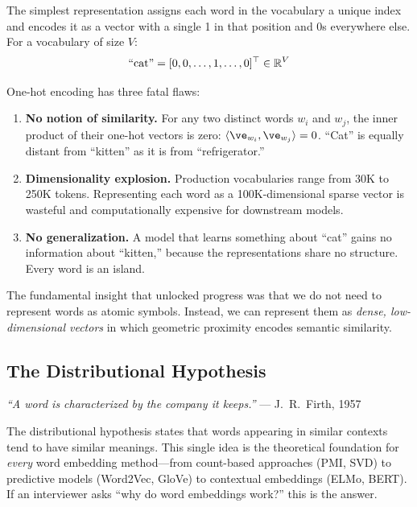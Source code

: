 The simplest representation assigns each word in the vocabulary a unique index
and encodes it as a vector with a single 1 in that position and 0s everywhere
else.  For a vocabulary of size $V$:
\[
    \text{``cat''} = [0, 0, \ldots, 1, \ldots, 0]^\top \in \mathbb{R}^V
\]

One-hot encoding has three fatal flaws:

\begin{enumerate}[label=\textbf{\arabic*.}]
    \item \textbf{No notion of similarity.}  For any two distinct words $w_i$
    and $w_j$, the inner product of their one-hot vectors is zero:
    $\inner{\ve_{w_i}}{\ve_{w_j}} = 0$.  ``Cat'' is equally distant from
    ``kitten'' as it is from ``refrigerator.''

    \item \textbf{Dimensionality explosion.}  Production vocabularies range from
    30K to 250K tokens.  Representing each word as a 100K-dimensional sparse
    vector is wasteful and computationally expensive for downstream models.

    \item \textbf{No generalization.}  A model that learns something about
    ``cat'' gains no information about ``kitten,'' because the representations
    share no structure.  Every word is an island.
\end{enumerate}

The fundamental insight that unlocked progress was that we do not need to
represent words as atomic symbols.  Instead, we can represent them as
\emph{dense, low-dimensional vectors} in which geometric proximity encodes
semantic similarity.

\subsection{The Distributional Hypothesis}

\begin{keyinsight}
\emph{``A word is characterized by the company it keeps.''}
--- J.~R.~Firth, 1957

The distributional hypothesis states that words appearing in similar contexts
tend to have similar meanings.  This single idea is the theoretical foundation
for \emph{every} word embedding method---from count-based approaches (PMI, SVD)
to predictive models (Word2Vec, GloVe) to contextual embeddings (ELMo, BERT).
If an interviewer asks ``why do word embeddings work?'' this is the answer.
\end{keyinsight}

